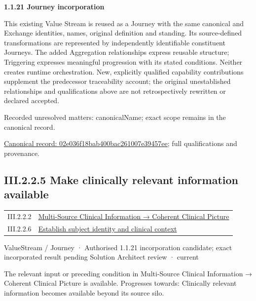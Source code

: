 \par\medskip\textbf{1.1.21 Journey incorporation}\par


This existing Value Stream is reused as a Journey with the same canonical and Exchange identities, names, original definition and standing. Its source-defined transformations are represented by independently identifiable constituent Journeys. The added Aggregation relationships express reusable structure; Triggering expresses meaningful progression with its stated conditions. Neither creates runtime orchestration. New, explicitly qualified capability contributions supplement the predecessor traceability account; the original unestablished relationships and qualifications above are not retrospectively rewritten or declared accepted.


{\small Recorded unresolved matters: canonicalName; exact scope remains in the canonical record.}\par
{\footnotesize \href{../../../../continuum/strategy/value-stream/02e036f18bab400bac261007e39457ee.md}{Canonical record: 02e036f18bab400bac261007e39457ee}; full qualifications and provenance.}\par
\subsection*{III.2.2.5 Make clinically relevant information available}
\label{navigation:III.2.2.5}

\begin{longtable}{p{.22\linewidth}p{.73\linewidth}}
III.2.2.2 & \hyperref[element:01f655eae3d8485699449c3dcf4f9b56]{Multi-Source Clinical Information → Coherent Clinical Picture} \\
III.2.2.6 & \hyperref[element:667853f4a4c343dcb559584cb08d71cf]{Establish subject identity and clinical context} \\
\end{longtable}
\label{element:2e20e48451b64dafa4fe7eaee2501c7a}
{\small ValueStream / Journey · Authorised 1.1.21 incorporation candidate; exact incorporated result pending Solution Architect review · current}\par

The relevant input or preceding condition in Multi-Source Clinical Information → Coherent Clinical Picture is available. Progresses towards: Clinically relevant information becomes available beyond its source silo.




